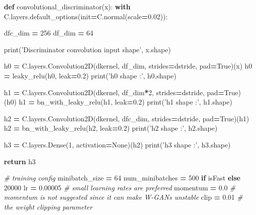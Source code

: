 \documentclass[]{book}
\newenvironment{Shaded}{\begin{snugshade}}{\end{snugshade}}
\newcommand{\KeywordTok}[1]{\textcolor[rgb]{0.13,0.29,0.53}{\textbf{#1}}}
\newcommand{\DecValTok}[1]{\textcolor[rgb]{0.00,0.00,0.81}{#1}}
\newcommand{\FloatTok}[1]{\textcolor[rgb]{0.00,0.00,0.81}{#1}}
\newcommand{\StringTok}[1]{\textcolor[rgb]{0.31,0.60,0.02}{#1}}
\newcommand{\CommentTok}[1]{\textcolor[rgb]{0.56,0.35,0.01}{\textit{#1}}}
\newcommand{\VariableTok}[1]{\textcolor[rgb]{0.00,0.00,0.00}{#1}}
\newcommand{\ControlFlowTok}[1]{\textcolor[rgb]{0.13,0.29,0.53}{\textbf{#1}}}
\newcommand{\OperatorTok}[1]{\textcolor[rgb]{0.81,0.36,0.00}{\textbf{#1}}}
\newcommand{\BuiltInTok}[1]{#1}
\newcommand{\NormalTok}[1]{#1}
\theoremstyle{definition}
\theoremstyle{definition}
\theoremstyle{definition}
\theoremstyle{remark}
\begin{document}
\begin{Shaded}
\begin{Highlighting}[]
\KeywordTok{def}\NormalTok{ convolutional_discriminator(x):}
    \ControlFlowTok{with}\NormalTok{ C.layers.default_options(init}\OperatorTok{=}\NormalTok{C.normal(scale}\OperatorTok{=}\FloatTok{0.02}\NormalTok{)):}
        
\NormalTok{        dfc_dim }\OperatorTok{=} \DecValTok{256}
\NormalTok{        df_dim }\OperatorTok{=} \DecValTok{64}
        
        \BuiltInTok{print}\NormalTok{(}\StringTok{'Discriminator convolution input shape'}\NormalTok{, x.shape)}

\NormalTok{        h0 }\OperatorTok{=}\NormalTok{ C.layers.Convolution2D(dkernel, df_dim, strides}\OperatorTok{=}\NormalTok{dstride, pad}\OperatorTok{=}\VariableTok{True}\NormalTok{)(x)}
\NormalTok{        h0 }\OperatorTok{=}\NormalTok{ leaky_relu(h0, leak}\OperatorTok{=}\FloatTok{0.2}\NormalTok{)}
        \BuiltInTok{print}\NormalTok{(}\StringTok{'h0 shape :'}\NormalTok{, h0.shape)}

\NormalTok{        h1 }\OperatorTok{=}\NormalTok{ C.layers.Convolution2D(dkernel, df_dim}\OperatorTok{*}\DecValTok{2}\NormalTok{, strides}\OperatorTok{=}\NormalTok{dstride, pad}\OperatorTok{=}\VariableTok{True}\NormalTok{)(h0)}
\NormalTok{        h1 }\OperatorTok{=}\NormalTok{ bn_with_leaky_relu(h1, leak}\OperatorTok{=}\FloatTok{0.2}\NormalTok{)}
        \BuiltInTok{print}\NormalTok{(}\StringTok{'h1 shape :'}\NormalTok{, h1.shape)}

\NormalTok{        h2 }\OperatorTok{=}\NormalTok{ C.layers.Convolution2D(dkernel, dfc_dim, strides}\OperatorTok{=}\NormalTok{dstride, pad}\OperatorTok{=}\VariableTok{True}\NormalTok{)(h1)}
\NormalTok{        h2 }\OperatorTok{=}\NormalTok{ bn_with_leaky_relu(h2, leak}\OperatorTok{=}\FloatTok{0.2}\NormalTok{)}
        \BuiltInTok{print}\NormalTok{(}\StringTok{'h2 shape :'}\NormalTok{, h2.shape)}

\NormalTok{        h3 }\OperatorTok{=}\NormalTok{ C.layers.Dense(}\DecValTok{1}\NormalTok{, activation}\OperatorTok{=}\VariableTok{None}\NormalTok{)(h2)}
        \BuiltInTok{print}\NormalTok{(}\StringTok{'h3 shape :'}\NormalTok{, h3.shape)}

        \ControlFlowTok{return}\NormalTok{ h3}
\end{Highlighting}
\end{Shaded}

\begin{Shaded}
\begin{Highlighting}[]
\CommentTok{# training config}
\NormalTok{minibatch_size }\OperatorTok{=} \DecValTok{64}
\NormalTok{num_minibatches }\OperatorTok{=} \DecValTok{500} \ControlFlowTok{if}\NormalTok{ isFast }\ControlFlowTok{else} \DecValTok{20000}
\NormalTok{lr }\OperatorTok{=} \FloatTok{0.00005} \CommentTok{# small learning rates are preferred}
\NormalTok{momentum }\OperatorTok{=} \FloatTok{0.0} \CommentTok{# momentum is not suggested since it can make W-GANs unstable}
\NormalTok{clip }\OperatorTok{=} \FloatTok{0.01} \CommentTok{# the weight clipping parameter}
\end{Highlighting}
\end{Shaded}
\end{document}
